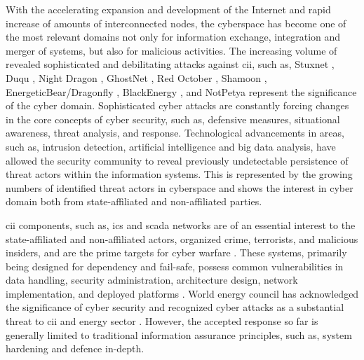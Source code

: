\label{sec:introduction}
\glsresetall
With the accelerating expansion and development of the Internet and rapid increase of amounts of interconnected nodes, the cyberspace has become one of the most relevant domains not only for information exchange, integration and merger of systems, but also for malicious activities.
The increasing volume of revealed sophisticated and debilitating attacks against \gls{cii}, such as, Stuxnet \cite{Langner2013}, Duqu \cite{Symantec2011}, Night Dragon \cite{McAfee2011}, GhostNet \cite{Deiber2009}, Red October \cite{Great2013}, Shamoon \cite{Great2012}, EnergeticBear/Dragonfly \cite{USCERT2018}, BlackEnergy \cite{Great2016}, and NotPetya \cite{UK2018} represent the significance of the cyber domain. Sophisticated cyber attacks are constantly forcing changes in the core concepts of cyber security, such as, defensive measures, situational awareness, threat analysis, and response.
Technological advancements in areas, such as, intrusion detection, artificial intelligence and big data analysis, have allowed the security community to reveal previously undetectable persistence of threat actors within the information systems. This is represented by the growing numbers of identified threat actors in cyberspace \cite{FireEyeAPT} \cite{MITRE-APT} and shows the interest in cyber domain both from state-affiliated and non-affiliated parties.

\gls{cii} components, such as, \gls{ics} and \gls{scada} networks are of an essential interest to the state-affiliated and non-affiliated actors, organized crime, terrorists, and malicious insiders, and are the prime targets for cyber warfare \cite{Nicholson2012}.
These systems, primarily being designed for dependency and fail-safe, possess common vulnerabilities in data handling, security administration, architecture design, network implementation, and deployed platforms \cite{Sandia2003}.
World energy council has acknowledged the significance of cyber security and recognized cyber attacks as a substantial threat to \gls{cii} and energy sector \cite{WEC2016}.
However, the accepted response so far is generally limited to traditional information assurance principles, such as, system hardening and defence in-depth.

